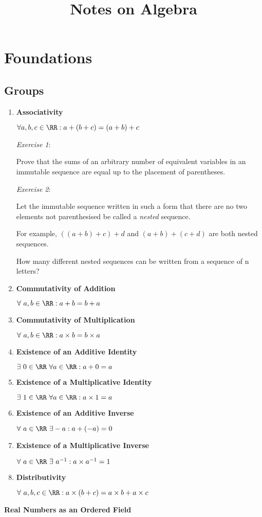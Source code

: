 \documentclass[11pt]{scrartcl}
\date{}
\title{Notes on Algebra}
\begin{document}
\maketitle

\section{Foundations}
\subsection{Groups}

\begin{enumerate}
\item \textbf{Associativity}

\(\forall a,b,c \in \RR: a+(b+c)=(a+b)+c\)

\emph{Exercise 1}:

Prove that the sums of an arbitrary number of equivalent variables in an immutable sequence are equal up to the placement of parentheses.

\emph{Exercise 2}:

Let the immutable sequence written in such a form that there are no two elements not parenthesised be called a \emph{nested} sequence.

For example, \(((a+b)+c)+d\) and \((a+b)+(c+d)\) are both nested sequences.

How many different nested sequences can be written from a sequence of n letters?

\item \textbf{Commutativity of Addition}

\(\forall \ a, b \in \RR: a+b=b+a\)

\item \textbf{Commutativity of Multiplication}

\(\forall \ a, b \in \RR: a \times b=b \times a\)

\item \textbf{Existence of an Additive Identity}

\(\exists \ 0\in \RR\ \forall a \in \RR: a+0=a\)

\item \textbf{Existence of a Multiplicative Identity}

\(\exists \ 1\in\RR\ \forall a \in \RR: a\times 1=a\)

\item \textbf{Existence of an Additive Inverse}

\(\forall \ a\in\RR\ \exists -a: a+(-a)=0\)

\item \textbf{Existence of a Multiplicative Inverse}

\(\forall \ a\in\RR\ \exists\ a^{-1}: a\times a^{-1}=1\)

\item \textbf{Distributivity}

\(\forall \ a,b,c \in \RR: a\times(b+c)=a\times b+a\times c\)
\end{enumerate}
\item \textbf{Real Numbers as an Ordered Field}
\label{sec:orgd6ca6e2}
\end{document}
